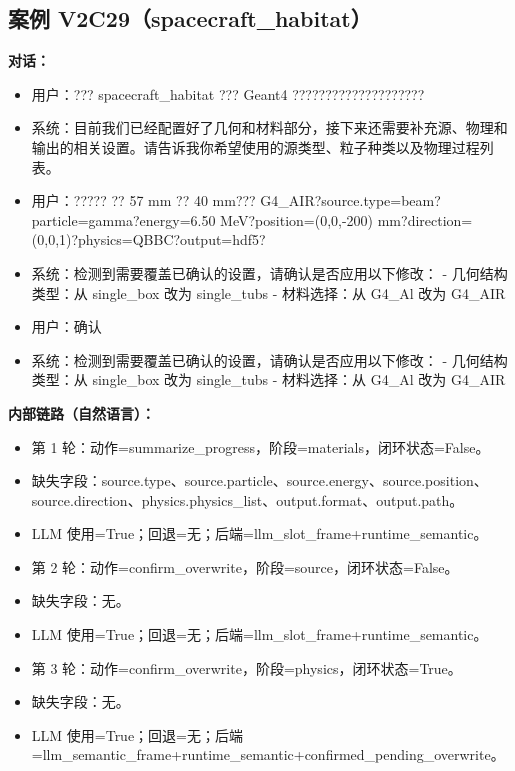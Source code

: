 \documentclass[11pt]{ctexart}
\begin{document}
\subsection{案例 V2C29（spacecraft\_habitat）}
\textbf{对话：}
\begin{itemize}
\item 用户：??? spacecraft\_habitat ??? Geant4 ????????????????????
\item 系统：目前我们已经配置好了几何和材料部分，接下来还需要补充源、物理和输出的相关设置。请告诉我你希望使用的源类型、粒子种类以及物理过程列表。
\item 用户：????? ?? 57 mm ?? 40 mm??? G4\_AIR?source.type=beam?particle=gamma?energy=6.50 MeV?position=(0,0,-200) mm?direction=(0,0,1)?physics=QBBC?output=hdf5?
\item 系统：检测到需要覆盖已确认的设置，请确认是否应用以下修改：
- 几何结构类型：从 single\_box 改为 single\_tubs
- 材料选择：从 G4\_Al 改为 G4\_AIR
\item 用户：确认
\item 系统：检测到需要覆盖已确认的设置，请确认是否应用以下修改：
- 几何结构类型：从 single\_box 改为 single\_tubs
- 材料选择：从 G4\_Al 改为 G4\_AIR
\end{itemize}
\textbf{内部链路（自然语言）：}
\begin{itemize}
\item 第 1 轮：动作=summarize\_progress，阶段=materials，闭环状态=False。
\item 缺失字段：source.type、source.particle、source.energy、source.position、source.direction、physics.physics\_list、output.format、output.path。
\item LLM 使用=True；回退=无；后端=llm\_slot\_frame+runtime\_semantic。
\item 第 2 轮：动作=confirm\_overwrite，阶段=source，闭环状态=False。
\item 缺失字段：无。
\item LLM 使用=True；回退=无；后端=llm\_slot\_frame+runtime\_semantic。
\item 第 3 轮：动作=confirm\_overwrite，阶段=physics，闭环状态=True。
\item 缺失字段：无。
\item LLM 使用=True；回退=无；后端=llm\_semantic\_frame+runtime\_semantic+confirmed\_pending\_overwrite。
\end{itemize}
\end{document}
